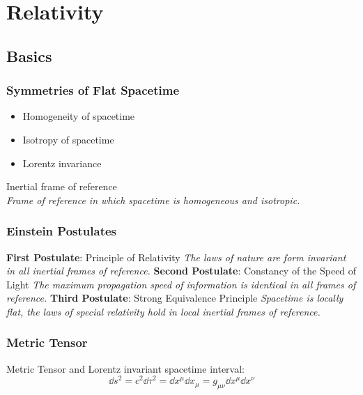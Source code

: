 \section{Relativity}
	\subsection{Basics}
		\subsubsection{Symmetries of Flat Spacetime}
			\begin{itemize}
				\item Homogeneity of spacetime
				\item Isotropy of spacetime
				\item Lorentz invariance
			\end{itemize}

			\noindent
			Inertial frame of reference \\
				\indent \textit{Frame of reference in which spacetime is homogeneous and isotropic.}

		\subsubsection{Einstein Postulates}
			\textbf{First Postulate}: Principle of Relativity \newline
				\indent \textit{The laws of nature are form invariant in all inertial frames of reference.}  \nl
			\textbf{Second Postulate}: Constancy of the Speed of Light \newline
				\indent \textit{The maximum propagation speed of information is identical in all frames of reference.}
				\label{post:c}\nl
			\textbf{Third Postulate}: Strong Equivalence Principle \newline
				\indent \textit{Spacetime is locally flat, \ie the laws of special relativity hold in local inertial frames of reference.}  \vsp

	\subsubsection{Metric Tensor}
		Metric Tensor and Lorentz invariant spacetime interval:
		\begin{equation}
			\dd s^2 = c^2 \dd \tau^2 = \dd x^\mu \dd x_\mu = g_{\mu\nu} \dd x^\mu \dd x^\nu
		\end{equation}

